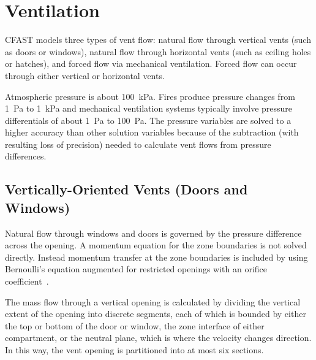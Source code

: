 \chapter{Ventilation}

CFAST models three types of vent flow: natural flow through vertical vents (such as doors or windows),  natural flow through horizontal vents (such as ceiling holes or hatches), and forced flow via mechanical ventilation. Forced flow can occur through either vertical or horizontal vents.

Atmospheric pressure is about 100~kPa. Fires produce pressure changes from 1~Pa to 1~kPa and mechanical ventilation systems typically involve pressure differentials of about 1~Pa to 100~Pa.  The pressure variables are solved to a higher accuracy than other solution variables because of the subtraction (with resulting loss of precision) needed to calculate vent flows from pressure differences.


\section{Vertically-Oriented Vents (Doors and Windows)}

Natural flow through windows and doors is governed by the pressure difference across the opening.  A momentum equation for the zone boundaries is not solved directly.  Instead momentum transfer at the zone boundaries is included by using Bernoulli's equation augmented for restricted openings with an orifice coefficient~\cite{Quintiere:1984, Steckler_Coefficients}.

The mass flow through a vertical opening is calculated by dividing the vertical extent of the opening into discrete segments, each of which is bounded by either the top or bottom of the door or window, the zone interface of either compartment, or the neutral plane, which is where the velocity changes direction. In this way, the vent opening is partitioned into at most six sections.

